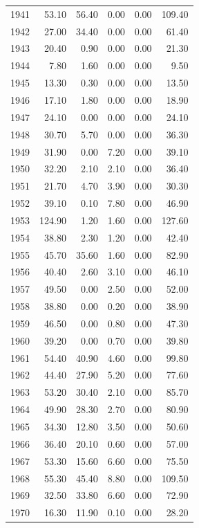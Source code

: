 \documentclass[12pt,]{article}
\begin{document}
\begin{longtable}{rrrrrr}
  1941 & 53.10 & 56.40 & 0.00 & 0.00 & 109.40 \\ 
  1942 & 27.00 & 34.40 & 0.00 & 0.00 & 61.40 \\ 
  1943 & 20.40 & 0.90 & 0.00 & 0.00 & 21.30 \\ 
  1944 & 7.80 & 1.60 & 0.00 & 0.00 & 9.50 \\ 
  1945 & 13.30 & 0.30 & 0.00 & 0.00 & 13.50 \\ 
  1946 & 17.10 & 1.80 & 0.00 & 0.00 & 18.90 \\ 
  1947 & 24.10 & 0.00 & 0.00 & 0.00 & 24.10 \\ 
  1948 & 30.70 & 5.70 & 0.00 & 0.00 & 36.30 \\ 
  1949 & 31.90 & 0.00 & 7.20 & 0.00 & 39.10 \\ 
  1950 & 32.20 & 2.10 & 2.10 & 0.00 & 36.40 \\ 
  1951 & 21.70 & 4.70 & 3.90 & 0.00 & 30.30 \\ 
  1952 & 39.10 & 0.10 & 7.80 & 0.00 & 46.90 \\ 
  1953 & 124.90 & 1.20 & 1.60 & 0.00 & 127.60 \\ 
  1954 & 38.80 & 2.30 & 1.20 & 0.00 & 42.40 \\ 
  1955 & 45.70 & 35.60 & 1.60 & 0.00 & 82.90 \\ 
  1956 & 40.40 & 2.60 & 3.10 & 0.00 & 46.10 \\ 
  1957 & 49.50 & 0.00 & 2.50 & 0.00 & 52.00 \\ 
  1958 & 38.80 & 0.00 & 0.20 & 0.00 & 38.90 \\ 
  1959 & 46.50 & 0.00 & 0.80 & 0.00 & 47.30 \\ 
  1960 & 39.20 & 0.00 & 0.70 & 0.00 & 39.80 \\ 
  1961 & 54.40 & 40.90 & 4.60 & 0.00 & 99.80 \\ 
  1962 & 44.40 & 27.90 & 5.20 & 0.00 & 77.60 \\ 
  1963 & 53.20 & 30.40 & 2.10 & 0.00 & 85.70 \\ 
  1964 & 49.90 & 28.30 & 2.70 & 0.00 & 80.90 \\ 
  1965 & 34.30 & 12.80 & 3.50 & 0.00 & 50.60 \\ 
  1966 & 36.40 & 20.10 & 0.60 & 0.00 & 57.00 \\ 
  1967 & 53.30 & 15.60 & 6.60 & 0.00 & 75.50 \\ 
  1968 & 55.30 & 45.40 & 8.80 & 0.00 & 109.50 \\ 
  1969 & 32.50 & 33.80 & 6.60 & 0.00 & 72.90 \\ 
  1970 & 16.30 & 11.90 & 0.10 & 0.00 & 28.20 \\ 

\end{longtable}
\end{document}
